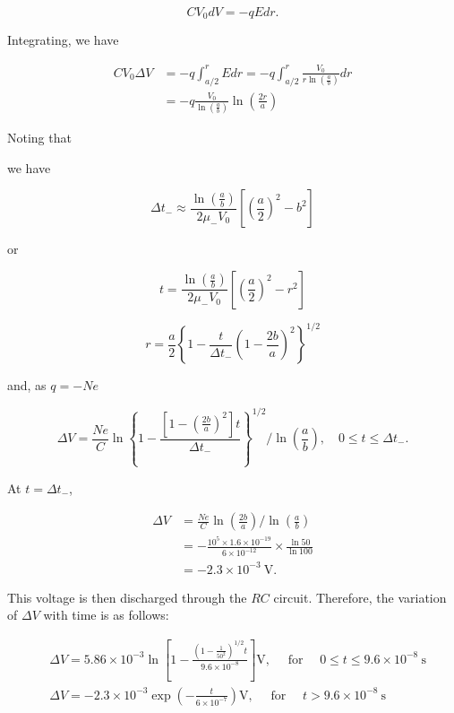 \documentclass[10pt]{article}
\begin{document}
$$
C V_{0} d V=-q E d r .
$$



Integrating, we have

$$
\begin{aligned}
C V_{0} \Delta V &=-q \int_{a / 2}^{r} E d r=-q \int_{a / 2}^{r} \frac{V_{0}}{r \ln \left(\frac{a}{b}\right)} d r \\
&=-q \frac{V_{0}}{\ln \left(\frac{a}{b}\right)} \ln \left(\frac{2 r}{a}\right)
\end{aligned}
$$

Noting that

we have

$$
\Delta t_{-} \approx \frac{\ln \left(\frac{a}{b}\right)}{2 \mu_{-} V_{0}}\left[\left(\frac{a}{2}\right)^{2}-b^{2}\right]
$$

or

$$
t=\frac{\ln \left(\frac{a}{b}\right)}{2 \mu_{-} V_{0}}\left[\left(\frac{a}{2}\right)^{2}-r^{2}\right]
$$

$$
r=\frac{a}{2}\left\{1-\frac{t}{\Delta t_{-}}\left(1-\frac{2 b}{a}\right)^{2}\right\}^{1 / 2}
$$

and, as $q=-N e$

$$
\Delta V=\frac{N e}{C} \ln \left\{1-\frac{\left[1-\left(\frac{2 b}{a}\right)^{2}\right] t}{\Delta t_{-}}\right\}^{1 / 2} / \ln \left(\frac{a}{b}\right), \quad 0 \leq t \leq \Delta t_{-} .
$$

At $t=\Delta t_{-}$,

$$
\begin{aligned}
\Delta V &=\frac{N e}{C} \ln \left(\frac{2 b}{a}\right) / \ln \left(\frac{a}{b}\right) \\
&=-\frac{10^{5} \times 1.6 \times 10^{-19}}{6 \times 10^{-12}} \times \frac{\ln 50}{\ln 100} \\
&=-2.3 \times 10^{-3} \mathrm{~V} .
\end{aligned}
$$

This voltage is then discharged through the $R C$ circuit. Therefore, the variation of $\Delta V$ with time is as follows:

$$
\begin{aligned}
&\Delta V=5.86 \times 10^{-3} \ln \left[1-\frac{\left(1-\frac{1}{50^{2}}\right)^{1 / 2} t}{9.6 \times 10^{-8}}\right] \mathrm{V}, \quad \text { for } \quad 0 \leq t \leq 9.6 \times 10^{-8} \mathrm{~s} \\
&\Delta V=-2.3 \times 10^{-3} \exp \left(-\frac{t}{6 \times 10^{-7}}\right) \mathrm{V}, \quad \text { for } \quad t>9.6 \times 10^{-8} \mathrm{~s}
\end{aligned}
$$
\end{document}
